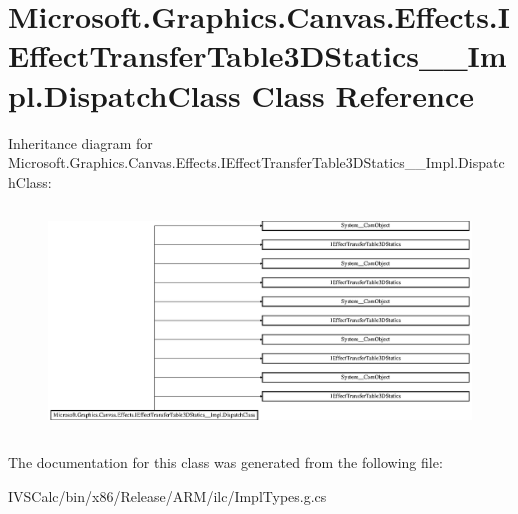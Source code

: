 \hypertarget{class_microsoft_1_1_graphics_1_1_canvas_1_1_effects_1_1_i_effect_transfer_table3_d_statics_____impl_1_1_dispatch_class}{}\section{Microsoft.\+Graphics.\+Canvas.\+Effects.\+I\+Effect\+Transfer\+Table3\+D\+Statics\+\_\+\+\_\+\+Impl.\+Dispatch\+Class Class Reference}
\label{class_microsoft_1_1_graphics_1_1_canvas_1_1_effects_1_1_i_effect_transfer_table3_d_statics_____impl_1_1_dispatch_class}
Inheritance diagram for Microsoft.\+Graphics.\+Canvas.\+Effects.\+I\+Effect\+Transfer\+Table3\+D\+Statics\+\_\+\+\_\+\+Impl.\+Dispatch\+Class\+:\begin{figure}[H]
\begin{center}
\leavevmode
\includegraphics[height=6.039216cm]{class_microsoft_1_1_graphics_1_1_canvas_1_1_effects_1_1_i_effect_transfer_table3_d_statics_____impl_1_1_dispatch_class}
\end{center}
\end{figure}


The documentation for this class was generated from the following file\+:\begin{DoxyCompactItemize}
\item 
I\+V\+S\+Calc/bin/x86/\+Release/\+A\+R\+M/ilc/Impl\+Types.\+g.\+cs\end{DoxyCompactItemize}
